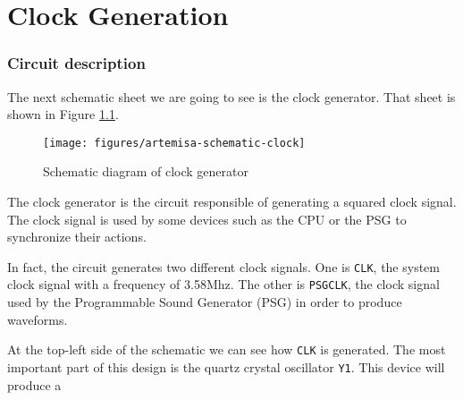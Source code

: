 \chapter{Clock Generation}

\subsection{Circuit description}

The next schematic sheet we are going to see is the clock generator. That sheet is shown in Figure \ref{fig:artemisa-schematic-clock}.

\begin{figure}[h]
  \centering
  \texttt{[image: figures/artemisa-schematic-clock]}
  \caption{Schematic diagram of clock generator}
  \label{fig:artemisa-schematic-clock}
\end{figure}

The clock generator is the circuit responsible of generating a squared clock signal. The clock signal is used by some devices such as the CPU or the PSG to synchronize their actions.

In fact, the circuit generates two different clock signals. One is {\tt CLK}, the system clock signal with a frequency of 3.58Mhz. The other is {\tt PSGCLK}, the clock signal used by the Programmable Sound Generator (PSG) in order to produce waveforms.

At the top-left side of the schematic we can see how {\tt CLK} is generated. The most important part of this design is the quartz crystal oscillator {\tt Y1}. This device will produce a